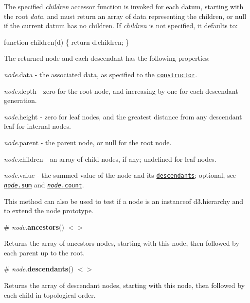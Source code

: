 The specified {\itshape children} accessor function is invoked for each datum, starting with the root {\itshape data}, and must return an array of data representing the children, or null if the current datum has no children. If {\itshape children} is not specified, it defaults to\+:


\begin{DoxyCode}
function children(d) \{
  return d.children;
\}
\end{DoxyCode}


The returned node and each descendant has the following properties\+:


\begin{DoxyItemize}
\item {\itshape node}.data -\/ the associated data, as specified to the \href{#hierarchy}{\tt constructor}.
\item {\itshape node}.depth -\/ zero for the root node, and increasing by one for each descendant generation.
\item {\itshape node}.height -\/ zero for leaf nodes, and the greatest distance from any descendant leaf for internal nodes.
\item {\itshape node}.parent -\/ the parent node, or null for the root node.
\item {\itshape node}.children -\/ an array of child nodes, if any; undefined for leaf nodes.
\item {\itshape node}.value -\/ the summed value of the node and its \href{#node_descendants}{\tt descendants}; optional, see \href{#node_sum}{\tt {\itshape node}.sum} and \href{#node_count}{\tt {\itshape node}.count}.
\end{DoxyItemize}

This method can also be used to test if a node is an {\ttfamily instanceof d3.\+hierarchy} and to extend the node prototype.

\label{_node_ancestors}%
\# {\itshape node}.{\bfseries ancestors}() \href{https://github.com/d3/d3-hierarchy/blob/master/src/hierarchy/ancestors.js}{\tt $<$$>$}

Returns the array of ancestors nodes, starting with this node, then followed by each parent up to the root.

\label{_node_descendants}%
\# {\itshape node}.{\bfseries descendants}() \href{https://github.com/d3/d3-hierarchy/blob/master/src/hierarchy/descendants.js}{\tt $<$$>$}

Returns the array of descendant nodes, starting with this node, then followed by each child in topological order.

